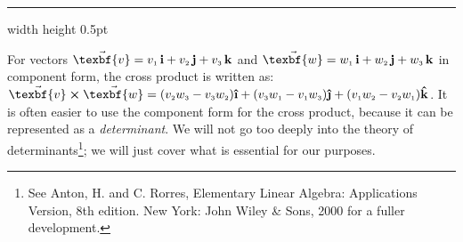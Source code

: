\begin{exmp}
\begin{figure}[h]
\begin{center}
\vspace{-4mm}
  \end{center}
  \caption[]{}
  \label{fig:vectripleprod}
 \end{figure}\vspace{-2mm}
\end{exmp}
\hrule width \textwidth height 0.5pt
\vspace{4mm}

For vectors $\vec{\texbf{v}} = \vecthreeijk{v}$ and $\vec{\texbf{w}} = \vecthreeijk{w}$ in component form, the cross
product is written as: $\Crossprod{\vec{\texbf{v}}}{\vec{\texbf{w}}} = (\ssub{v}{2}\ssub{w}{3} -
\ssub{v}{3}\ssub{w}{2})\boldsymbol{\hat{\textbf{\i}}} + (\ssub{v}{3}\ssub{w}{1} - \ssub{v}{1}\ssub{w}{3})\boldsymbol{\hat{\textbf{\j}}} +
(\ssub{v}{1}\ssub{w}{2} - \ssub{v}{2}\ssub{w}{1})\boldsymbol{\hat{\textbf{k}}}$.
It is often easier to use the component form for the cross product, because it can be represented as a
\emph{determinant}. We will not go too deeply into the theory of determinants\footnote{See Anton, H. and C. Rorres, Elementary Linear Algebra: Applications Version, 8th edition. New
York: John Wiley & Sons, 2000 for a fuller development.}; we will just cover what is essential for our purposes.

